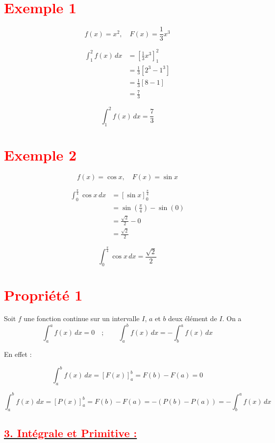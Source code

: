 \documentclass[12pt]{article}
\begin{document}
\section*{\textbf{\textcolor{red}{Exemple 1}}}

\[
f(x) = x^2, \quad F(x) = \frac{1}{3} x^3
\]

\[
\begin{aligned}
\int_1^2 f(x) \, dx &= \left[ \frac{1}{3} x^3 \right]_1^2 \\
&= \frac{1}{3} \left[ 2^3 - 1^3 \right] \\
&= \frac{1}{3} \left[ 8 - 1 \right] \\
&= \frac{7}{3}
\end{aligned}
\]

\[\boxed{\int_1^2 f(x) \, dx=\frac{7}{3}} \]

\section*{\textbf{\textcolor{red}{Exemple 2}}}

\[
f(x) = \cos x, \quad F(x) = \sin x
\]

\[
\begin{aligned}
\int_0^{\frac{\pi}{4}} \cos x \, dx &= \left[ \sin x \right]_0^{\frac{\pi}{4}} \\
&= \sin \left( \frac{\pi}{4} \right) - \sin(0) \\
&= \frac{\sqrt{2}}{2} - 0 \\
&= \frac{\sqrt{2}}{2}
\end{aligned}
\]

\[\boxed{\int_0^{\frac{\pi}{4}} \cos x \, dx = \frac{\sqrt{2}}{2}} \]

\section*{\textbf{\textcolor{red}{Propriété 1 }}}
Soit \( f \) une fonction continue sur un intervalle \( I \), \( a \) et \( b \) deux élément de \( I \). On a
\[
\int_a^a f(x) \, dx = 0 \quad;\quad \quad \int_a^b f(x) \, dx = - \int_b^a f(x) \, dx
\]

En effet :

\[
\int_a^b f(x) \, dx = \left[ F(x) \right]_a^b = F(b) - F(a) = 0
\]

\[
\int_a^b f(x) \, dx = \left[ P(x) \right]_a^b = F(b) - F(a) = - \left( P(b) - P(a) \right)=-\int_b^a f(x) \, dx
\]

\subsection*{\underline{\textbf{\textcolor{red}{3. Intégrale et Primitive :}}}}
\end{document}
